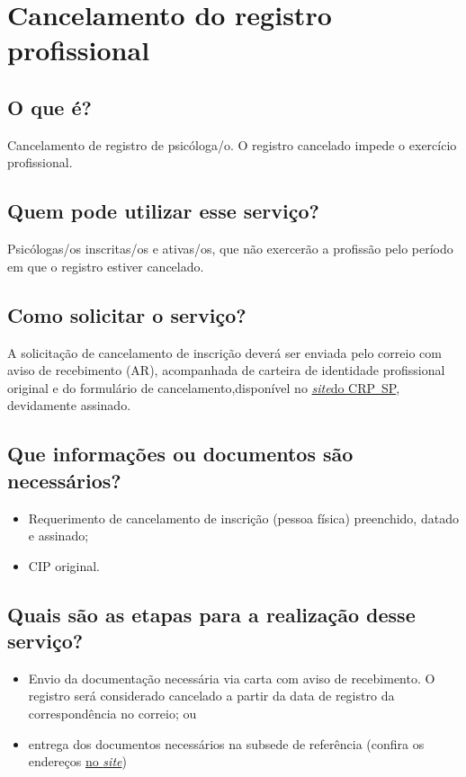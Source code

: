 \chapter{Cancelamento do registro profissional}
\label{chap:pf-cancelamento}

\section{O que é?}

Cancelamento de registro de psicóloga/o. O registro cancelado impede o exercício profissional.

\section{Quem pode utilizar esse serviço?}

Psicólogas/os inscritas/os e ativas/os, que não exercerão a profissão pelo período em que o registro estiver cancelado.

\section{Como solicitar o serviço?}

A solicitação de cancelamento de inscrição deverá ser enviada pelo correio com aviso de recebimento (AR), acompanhada de carteira de identidade profissional original e do formulário de cancelamento,disponível no \href{https://www.crpsp.org/pagina/view/312}{\emph{site}do CRP~SP}, devidamente assinado.

\section{Que informações ou documentos são necessários?}

\begin{itemize}
  \item  Requerimento  de cancelamento de inscrição (pessoa física) preenchido, datado e  assinado;
  \item  CIP original.
\end{itemize}

\section{Quais são as etapas para a realização desse serviço?}

\begin{itemize}
  \item  Envio da documentação necessária via carta com aviso de recebimento. O  registro será considerado cancelado a partir da data de registro da  correspondência no correio; ou
  \item  entrega dos documentos necessários na subsede de referência (confira  os endereços \href{https://www.crpsp.org/sede/index}{no \emph{site}})
\end{itemize}

